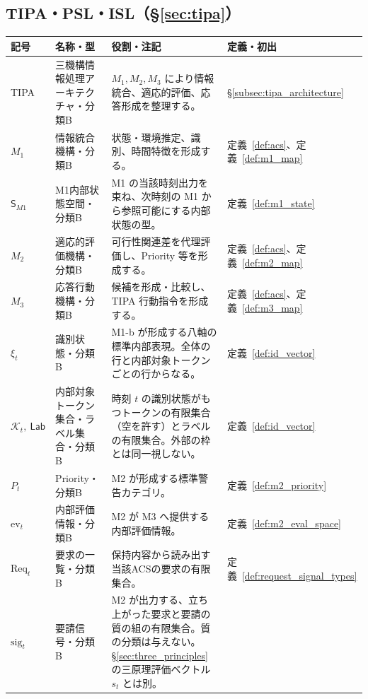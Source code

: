 \subsection{TIPA・PSL・ISL（\S\ref{sec:tipa}）}
\label{app:symbols_s4}

\begingroup
\small
\setlength{\tabcolsep}{4pt}
\renewcommand{\arraystretch}{1.18}
\begin{longtable}{p{3.0cm} p{3.0cm} p{6.6cm} p{2.0cm}}
\hline
\textbf{記号} & \textbf{名称・型} & \textbf{役割・注記} & \textbf{定義・初出} \\
\hline
\endhead
\hline
\endfoot
TIPA & 三機構情報処理アーキテクチャ・分類B &
$M_1,M_2,M_3$ により情報統合、適応的評価、応答形成を整理する。 &
\S\ref{subsec:tipa_architecture} \\[3pt]
$M_1$ & 情報統合機構・分類B &
状態・環境推定、識別、時間特徴を形成する。 &
定義~\ref{def:acs}、定義~\ref{def:m1_map} \\[3pt]
$\mathsf S_{M1}$ & M1内部状態空間・分類B &
M1 の当該時刻出力を束ね、次時刻の M1 から参照可能にする内部状態の型。 &
定義~\ref{def:m1_state} \\[3pt]
$M_2$ & 適応的評価機構・分類B &
可行性関連差を代理評価し、Priority 等を形成する。 &
定義~\ref{def:acs}、定義~\ref{def:m2_map} \\[3pt]
$M_3$ & 応答行動機構・分類B &
候補を形成・比較し、TIPA 行動指令を形成する。 &
定義~\ref{def:acs}、定義~\ref{def:m3_map} \\[3pt]
$\xi_t$ & 識別状態・分類B &
M1-b が形成する八軸の標準内部表現。全体の行と内部対象トークンごとの行からなる。 &
定義~\ref{def:id_vector} \\[3pt]
$\mathcal K_t,\ \mathsf{Lab}$ & 内部対象トークン集合・ラベル集合・分類B &
時刻 $t$ の識別状態がもつトークンの有限集合（空を許す）とラベルの有限集合。外部の枠とは同一視しない。 &
定義~\ref{def:id_vector} \\[3pt]
$P_t$ & Priority・分類B &
M2 が形成する標準警告カテゴリ。 &
定義~\ref{def:m2_priority} \\[3pt]
$\mathrm{ev}_t$ & 内部評価情報・分類B &
M2 が M3 へ提供する内部評価情報。 &
定義~\ref{def:m2_eval_space} \\[3pt]
$\mathrm{Req}_t$ & 要求の一覧・分類B &
保持内容から読み出す当該ACSの要求の有限集合。 &
定義~\ref{def:request_signal_types} \\[3pt]
$\mathrm{sig}_t$ & 要請信号・分類B &
M2 が出力する、立ち上がった要求と要請の質の組の有限集合。質の分類は与えない。\S\ref{sec:three_principles} の三原理評価ベクトル $s_t$ とは別。 &

\end{longtable}
